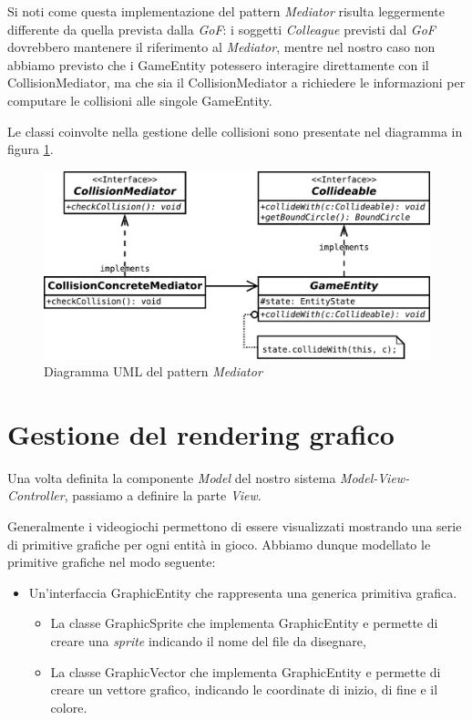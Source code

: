 \documentclass[a4paper,12pt]{article}
\begin{document}
Si noti come questa implementazione del pattern \emph{Mediator} risulta leggermente differente da quella prevista dalla \emph{GoF}: i soggetti \emph{Colleague} previsti dal \emph{GoF} dovrebbero mantenere il riferimento al \emph{Mediator}, mentre nel nostro caso non abbiamo previsto che i \textsf{GameEntity} potessero interagire direttamente con il \textsf{CollisionMediator}, ma che sia il \textsf{CollisionMediator} a richiedere le informazioni per computare le collisioni alle singole \textsf{GameEntity}.

Le classi coinvolte nella gestione delle collisioni sono presentate nel diagramma in figura \ref{img:Mediator}.

\begin{figure}[h]
\centering
\includegraphics[width=12cm]{Mediator.pdf}
\caption{Diagramma UML del pattern \emph{Mediator}}
\label{img:Mediator}
\end{figure}


\section{Gestione del rendering grafico}
\label{sec:graphics}

Una volta definita la componente \emph{Model} del nostro sistema \emph{Model-View-Controller}, passiamo a definire la parte \emph{View}.

Generalmente i videogiochi permettono di essere visualizzati mostrando una serie di primitive grafiche per ogni entit\`a in gioco. Abbiamo dunque modellato le primitive grafiche nel modo seguente:

\begin{itemize}
\item Un'interfaccia \textsf{GraphicEntity} che rappresenta una generica primitiva grafica.
\begin{itemize}
\item La classe \textsf{GraphicSprite} che implementa \textsf{GraphicEntity} e permette di creare una \emph{sprite} indicando il nome del file da disegnare,
\item La classe \textsf{GraphicVector} che implementa \textsf{GraphicEntity} e permette di creare un vettore grafico, indicando le coordinate di inizio, di fine e il colore.
\end{itemize}
\end{itemize}
\end{document}
